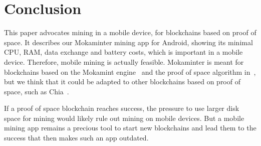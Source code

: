 \section{Conclusion}\label{sec:conclusion}

This paper advocates mining in a mobile device, for blockchains based on
proof of space. It describes our Mokaminter
mining app for Android, showing its minimal
CPU, RAM, data exchange and battery costs, which is important in a mobile device.
Therefore, mobile mining is actually feasible.
Mokaminter is meant for blockchains based on the Mokamint engine~\cite{mokamint-source-code} and
the proof of space algorithm in~\cite{Spoto25}, but we think
that it could be adapted to other blockchains based on
proof of space, such as Chia~\cite{AbusalahACKPR17}.

If a proof of space blockchain reaches success, the pressure to use larger disk space
for mining would likely rule out mining on mobile devices.
But a mobile mining app remains a precious tool to start new blockchains
and lead them to the success that then makes such an app outdated.

